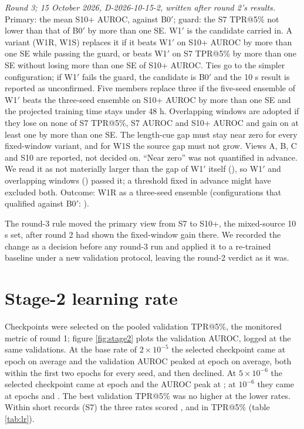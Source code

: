 \documentclass{iopjournal}
\makeatletter
\newcommand{\tpr}{TPR@5\%}
\newcommand{\Bp}{B0$'$}
\newcommand{\Wp}{W1$'$}
\makeatother
\begin{document}
\textit{Round 3; 15 October 2026, D-2026-10-15-2, written after round 2's results.} Primary: the mean S10+ AUROC, against \Bp; guard: the S7 \tpr{} not lower than that of \Bp{} by more than one SE. \Wp{} is the candidate carried in. A variant (W1R, W1S) replaces it if it beats \Wp{} on S10+ AUROC by more than one SE while passing the guard, or beats \Wp{} on S7 \tpr{} by more than one SE without losing more than one SE of S10+ AUROC. Ties go to the simpler configuration; if \Wp{} fails the guard, the candidate is \Bp{} and the 10 s result is reported as unconfirmed. Five members replace three if the five-seed ensemble of \Wp{} beats the three-seed ensemble on S10+ AUROC by more than one SE and the projected training time stays under 48 h. Overlapping windows are adopted if they lose on none of S7 \tpr, S7 AUROC and S10+ AUROC and gain on at least one by more than one SE. The length-cue gap must stay near zero for every fixed-window variant, and for W1S the source gap must not grow. Views A, B, C and S10 are reported, not decided on. ``Near zero'' was not quantified in advance. We read it as not materially larger than the gap of \Wp{} itself (\rThreeWoneGap), so \Wp{} and overlapping windows (\rThreeWoneTtaGap) passed it; a threshold fixed in advance might have excluded both. Outcome: W1R as a three-seed ensemble (configurations that qualified against \Bp: \rThreeQualifies).

The round-3 rule moved the primary view from S7 to S10+, the mixed-source 10 s set, after round 2 had shown the fixed-window gain there. We recorded the change as a decision before any round-3 run and applied it to a re-trained baseline under a new validation protocol, leaving the round-2 verdict as it was.

\section{Stage-2 learning rate}\label{SN2}
Checkpoints were selected on the pooled validation \tpr, the monitored metric of round 1; figure \ref{fig:stage2} plots the validation AUROC, logged at the same validations. At the base rate of $2\times10^{-5}$ the selected checkpoint came at epoch \bestEpHigh{} on average and the validation AUROC peaked at epoch \aucPeakEpHigh{} on average, both within the first two epochs for every seed, and then declined. At $5\times10^{-6}$ the selected checkpoint came at epoch \bestEpMid{} and the AUROC peak at \aucPeakEpMid; at $10^{-6}$ they came at epochs \bestEpLow{} and \aucPeakEpLow. The best validation \tpr{} was no higher at the lower rates. Within short records (S7) the three rates scored \bzSseven, \lrMidSseven{} and \lrLowSseven{} in \tpr{} (table \ref{tab:lr}).
\end{document}
